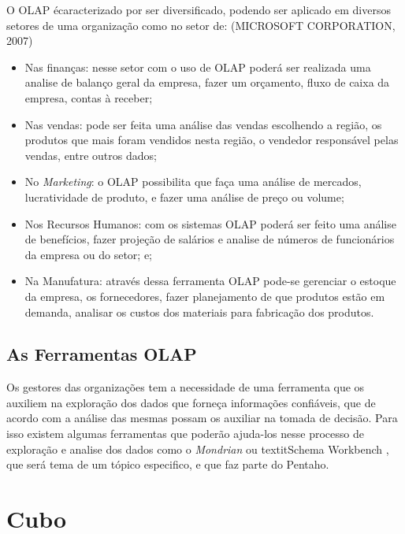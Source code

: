 O OLAP \'{e}caracterizado por ser diversificado, podendo ser aplicado em diversos setores de uma organiza\c{c}\~{a}o como no setor de: (MICROSOFT CORPORATION, 2007)

\begin{itemize}

    \item Nas finan\c{c}as: nesse setor com o uso de OLAP poder\'{a} ser realizada uma analise de balan\c{c}o geral da empresa, fazer um or\c{c}amento, fluxo de caixa da empresa, contas \`{a} receber;
    \item Nas vendas: pode ser feita uma an\'{a}lise das vendas escolhendo a regi\~{a}o, os produtos que mais foram vendidos nesta regi\~{a}o, o vendedor respons\'{a}vel pelas vendas, entre outros dados;
    \item No \textit{Marketing}: o OLAP possibilita que fa\c{c}a uma an\'{a}lise de mercados, lucratividade de produto, e fazer uma an\'{a}lise de pre\c{c}o ou volume;
    \item Nos Recursos Humanos: com os sistemas OLAP poder\'{a} ser feito uma an\'{a}lise de benef\'{i}cios, fazer proje\c{c}\~{a}o de sal\'{a}rios e analise de números de funcion\'{a}rios da empresa ou do setor; e;
    \item Na Manufatura: atrav\'{e}s dessa ferramenta OLAP pode-se gerenciar o estoque da empresa, os fornecedores, fazer planejamento de que produtos est\~{a}o em demanda, analisar os custos dos materiais para fabrica\c{c}\~{a}o dos produtos.

\end{itemize}

\subsection{As Ferramentas OLAP}

Os gestores das organiza\c{c}\~{o}es tem a necessidade de uma ferramenta que os auxiliem na explora\c{c}\~{a}o dos dados que forne\c{c}a informa\c{c}\~{o}es confi\'{a}veis, que de acordo com a an\'{a}lise das mesmas possam os auxiliar na tomada de decis\~{a}o. Para isso existem algumas ferramentas que poder\~{a}o ajuda-los nesse processo de explora\c{c}\~{a}o e analise dos dados como o \textit{Mondrian} ou textit{Schema Workbench} , que ser\'{a} tema de um t\'{o}pico especifico, e que faz parte do Pentaho.

\section{Cubo}

